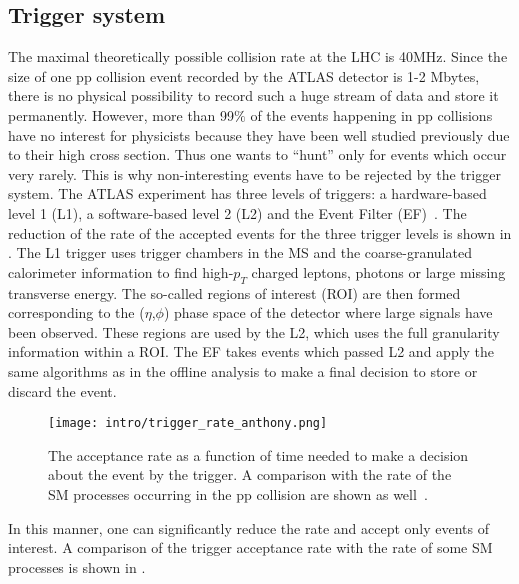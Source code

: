 \subsection{Trigger system}
The maximal theoretically possible collision rate at the LHC is 40MHz.
Since the size of one pp collision event recorded by the ATLAS detector is 1-2 Mbytes, there is no physical possibility to record such a huge stream of data and store it permanently. However, more than 99$\%$ of the events happening in pp collisions have no interest for physicists because they have been well studied previously due to their high cross section. Thus one wants to ``hunt'' only for events which occur very rarely. This is why non-interesting events have to be rejected by the trigger system.
The ATLAS experiment has three levels of triggers: a hardware-based level 1 (L1), a software-based level 2 (L2) and the Event Filter (EF)~\cite{tdr_tdaq}.
The reduction of the rate of the accepted events for the three trigger levels is shown in .
The L1 trigger uses trigger chambers in the MS and the coarse-granulated calorimeter information to find high-$p_T$ charged leptons, photons or large missing transverse energy. The so-called regions of interest (ROI) are then formed corresponding to the ($\eta$,$\phi$) phase space of the detector where large signals have been observed. These regions are used by the L2, which uses the full granularity information within a ROI. The EF takes events which passed L2 and apply the same algorithms as in the offline analysis to make a final decision to store or discard the event.

\begin{figure}[h!]
\centering
 \texttt{[image: intro/trigger\_rate\_anthony.png]}
 \caption{The acceptance rate as a function of time needed to make a decision about the event by the trigger. A comparison with the rate of the SM processes occurring in the pp collision are shown as well~\cite{anthony_thesis}.}
\label{fig:trigger_rate}
\end{figure}

In this manner, one can significantly reduce the rate and accept only events of interest. A comparison of the  trigger acceptance rate with the rate of some SM processes is shown in .



